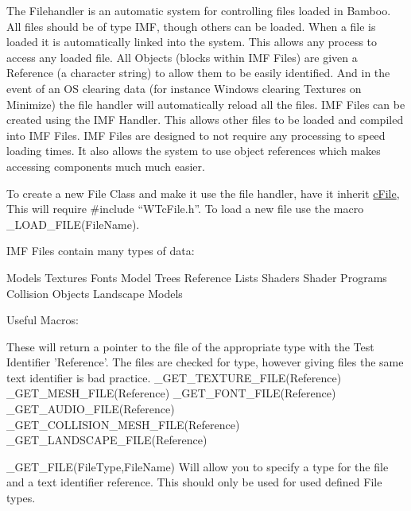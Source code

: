 The Filehandler is an automatic system for controlling files loaded in Bamboo. All files should be of type IMF, though others can be loaded. When a file is loaded it is automatically linked into the system. This allows any process to access any loaded file. All Objects (blocks within IMF Files) are given a Reference (a character string) to allow them to be easily identified. And in the event of an OS clearing data (for instance Windows clearing Textures on Minimize) the file handler will automatically reload all the files. IMF Files can be created using the IMF Handler. This allows other files to be loaded and compiled into IMF Files. IMF Files are designed to not require any processing to speed loading times. It also allows the system to use object references which makes accessing components much much easier.

To create a new File Class and make it use the file handler, have it inherit \hyperlink{classc_file}{cFile}, This will require \#include “WTcFile.h”. To load a new file use the macro \_\-LOAD\_\-FILE(FileName).

IMF Files contain many types of data:

Models Textures Fonts Model Trees Reference Lists Shaders Shader Programs Collision Objects Landscape Models

Useful Macros:

These will return a pointer to the file of the appropriate type with the Test Identifier 'Reference'. The files are checked for type, however giving files the same text identifier is bad practice. \_\-GET\_\-TEXTURE\_\-FILE(Reference) \_\-GET\_\-MESH\_\-FILE(Reference) \_\-GET\_\-FONT\_\-FILE(Reference) \_\-GET\_\-AUDIO\_\-FILE(Reference) \_\-GET\_\-COLLISION\_\-MESH\_\-FILE(Reference) \_\-GET\_\-LANDSCAPE\_\-FILE(Reference)

\_\-GET\_\-FILE(FileType,FileName) Will allow you to specify a type for the file and a text identifier reference. This should only be used for used defined File types.

